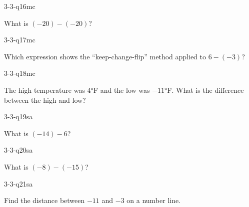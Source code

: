 \begin{practiceQuestion}{3-3-q16}{mc}
\begin{questionText}
What is $(-20) - (-20)$?
\end{questionText}
\end{practiceQuestion}

\begin{practiceQuestion}{3-3-q17}{mc}
\begin{questionText}
Which expression shows the ``keep-change-flip'' method applied to $6 - (-3)$?
\end{questionText}
\end{practiceQuestion}

\begin{practiceQuestion}{3-3-q18}{mc}
\begin{questionText}
The high temperature was $4°$F and the low was $-11°$F. What is the difference between the high and low?
\end{questionText}
\end{practiceQuestion}


\begin{practiceQuestion}{3-3-q19}{sa}
\begin{questionText}
What is $(-14) - 6$?
\end{questionText}
\end{practiceQuestion}

\begin{practiceQuestion}{3-3-q20}{sa}
\begin{questionText}
What is $(-8) - (-15)$?
\end{questionText}
\end{practiceQuestion}

\begin{practiceQuestion}{3-3-q21}{sa}
\begin{questionText}
Find the distance between $-11$ and $-3$ on a number line.
\end{questionText}
\end{practiceQuestion}


